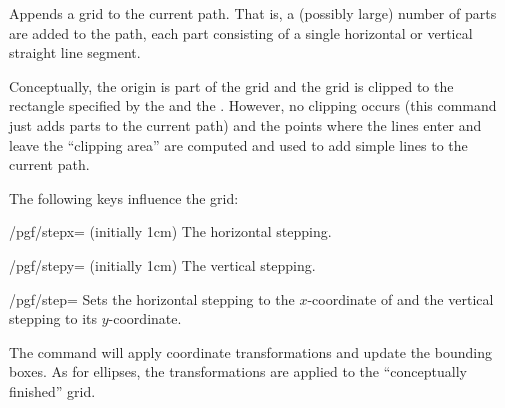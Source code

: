 \begin{command}{\pgfpathgrid{}}
    Appends a grid to the current path. That is, a (possibly large) number of
    parts are added to the path, each part consisting of a single horizontal or
    vertical straight line segment.

    Conceptually, the origin is part of the grid and the grid is clipped to the
    rectangle specified by the  and the . However, no clipping occurs (this command just adds parts to the
    current path) and the points where the lines enter and leave the ``clipping
    area'' are computed and used to add simple lines to the current path.

    The following keys influence the grid:
    \begin{key}{/pgf/stepx= (initially 1cm)}
        The horizontal stepping.
    \end{key}
    \begin{key}{/pgf/stepy= (initially 1cm)}
        The vertical stepping.
    \end{key}
    \begin{key}{/pgf/step=}
        Sets the horizontal stepping to the $x$-coordinate of  and
        the vertical stepping to its $y$-coordinate.
    \end{key}
\begin{codeexample}[]
\begin{pgfpicture}
  \pgfsetlinewidth{0.8pt}
  \pgfpathgrid[step={\pgfpoint{1cm}{1cm}}]
    {\pgfpoint{-3mm}{-3mm}}{\pgfpoint{33mm}{23mm}}
  \pgfsetlinewidth{0.4pt}
  \pgfpathgrid[stepx=1mm,stepy=1mm]
    {\pgfpoint{-1.5mm}{-1.5mm}}{\pgfpoint{31.5mm}{21.5mm}}
\end{pgfpicture}
\end{codeexample}
    The command will apply coordinate transformations and update the bounding
    boxes. As for ellipses, the transformations are applied to the
    ``conceptually finished'' grid.
\begin{codeexample}[]
\begin{pgfpicture}
  \pgfpathgrid[stepx=1mm,stepy=2mm]{\pgfpoint{0mm}{0mm}}{\pgfpoint{30mm}{30mm}}
\end{pgfpicture}
\end{codeexample}
\end{command}


